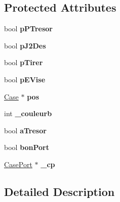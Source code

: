 \subsection*{Protected Attributes}
\begin{DoxyCompactItemize}
\item 
\hypertarget{class_bateau_a6d6408616609ad289342a6a135f2cba7}{
bool {\bfseries pPTresor}}
\label{class_bateau_a6d6408616609ad289342a6a135f2cba7}

\item 
\hypertarget{class_bateau_a309c21d803cb4001aa68f95641a0237f}{
bool {\bfseries pJ2Des}}
\label{class_bateau_a309c21d803cb4001aa68f95641a0237f}

\item 
\hypertarget{class_bateau_ad2b8e3498076f396687254c1e2d706da}{
bool {\bfseries pTirer}}
\label{class_bateau_ad2b8e3498076f396687254c1e2d706da}

\item 
\hypertarget{class_bateau_a7939fb4f79a9b08f6f0cde08676d7b1f}{
bool {\bfseries pEVise}}
\label{class_bateau_a7939fb4f79a9b08f6f0cde08676d7b1f}

\item 
\hypertarget{class_bateau_a339f689bed319640b0ee7a226b18e56e}{
\hyperlink{class_case}{Case} $\ast$ {\bfseries pos}}
\label{class_bateau_a339f689bed319640b0ee7a226b18e56e}

\item 
\hypertarget{class_bateau_add3dbf8892b08b6d6cd440fafbf54c5e}{
int {\bfseries \_\-couleurb}}
\label{class_bateau_add3dbf8892b08b6d6cd440fafbf54c5e}

\item 
\hypertarget{class_bateau_ad1d2a3e373ec5f985f26389f8eb355db}{
bool {\bfseries aTresor}}
\label{class_bateau_ad1d2a3e373ec5f985f26389f8eb355db}

\item 
\hypertarget{class_bateau_a8c13012f611467657dbe56e6ab959544}{
bool {\bfseries bonPort}}
\label{class_bateau_a8c13012f611467657dbe56e6ab959544}

\item 
\hypertarget{class_bateau_a0478f47cb4f75b0ba00fa1f2f72410fa}{
\hyperlink{class_case_port}{CasePort} $\ast$ {\bfseries \_\-cp}}
\label{class_bateau_a0478f47cb4f75b0ba00fa1f2f72410fa}

\end{DoxyCompactItemize}


\subsection{Detailed Description}


